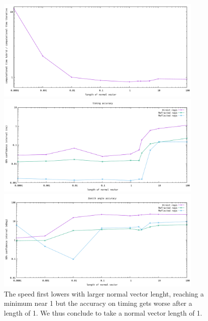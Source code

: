 \begin{figure}
	\centering
	\begin{minipage}{\textwidth}
		\includegraphics[width=0.9\textwidth]{figures/NormVsTime.pdf}
	\end{minipage}
	\begin{minipage}{\textwidth}
		\includegraphics[width=0.9\textwidth]{figures/NormVsSigmaTime.pdf}
	\end{minipage}
	\begin{minipage}{\textwidth}
		\includegraphics[width=0.9\textwidth]{figures/NormVsSigmaAZ.pdf}
	\end{minipage}
\caption{The speed first lowers with larger normal vector lenght, reaching a minimum near 1 but the accuracy on timing gets worse after a length of 1. We thus
conclude to take a normal vector length of 1.}
\label{fig:norminfl}
\end{figure}

